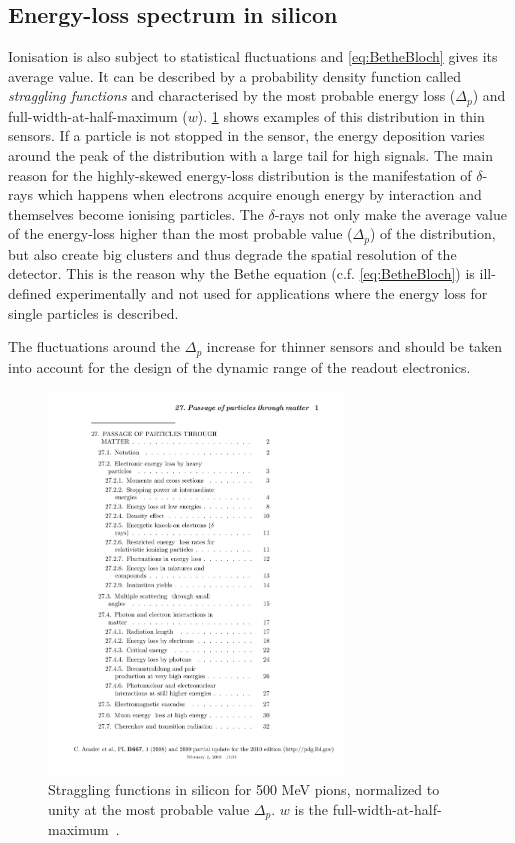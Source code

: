 \subsection{Energy-loss spectrum in silicon}
Ionisation is also subject to statistical fluctuations and
\cref{eq:BetheBloch} gives its average value. It can be described by a
probability density function called \textit{straggling functions} and
characterised by the most probable energy loss ($\Delta_{p}$) and
full-width-at-half-maximum ($w$). \cref{fig:LandauDistribution} shows
examples of this distribution in thin sensors. If a particle is not
stopped in the sensor, the energy deposition varies around the peak of
the distribution with a large tail for high signals. The main reason
for the highly-skewed energy-loss distribution is the manifestation of
$\delta$-rays which happens when electrons acquire enough energy by
interaction and themselves become ionising particles. The
$\delta$-rays not only make the average value of the energy-loss
higher than the most probable value ($\Delta_{p}$) of the
distribution, but also create big clusters and thus degrade the
spatial resolution of the detector. This is the reason why the Bethe
equation (c.f. \cref{eq:BetheBloch}) is ill-defined experimentally and
not used for applications where the energy loss for single particles
is described.

The fluctuations around the $\Delta_{p}$ increase for thinner sensors
and should be taken into account for the design of the dynamic range
of the readout electronics.


\begin{figure}[htbp]
  \centering
  \includegraphics[width=0.7\textwidth, page=14, trim = 50mm 160mm
    40mm 20mm, clip]{Articles/rpp2009-rev-passage-particles-matter.pdf}
  \caption{Straggling functions in silicon for 500 MeV pions,
    normalized to unity at the most probable value $\Delta_{p}$. $w$
    is the full-width-at-half-maximum~\cite{Beringer:1900zz}.}
  \label{fig:LandauDistribution}
\end{figure}

